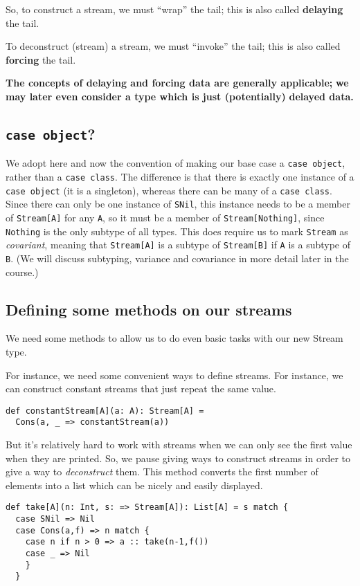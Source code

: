 \documentclass[11pt]{article}
\begin{document}
\begin{center}
So, to construct a stream, we must “wrap” the tail;
this is also called \textbf{delaying} the tail.

To deconstruct (stream) a stream, we must “invoke” the tail;
this is also called \textbf{forcing} the tail.

\textbf{The concepts of delaying and forcing data are generally applicable;}
\textbf{we may later even consider a type which is just (potentially)}
\textbf{delayed data.}
\end{center}

\subsection{\texttt{case object}?}
\label{sec:orga7b4ce3}
We adopt here and now the convention of making our base case
a \texttt{case object}, rather than a \texttt{case class}.
The difference is that there is exactly one instance of
a \texttt{case object} (it is a singleton),
whereas there can be many of a \texttt{case class}.
Since there can only be one instance of \texttt{SNil},
this instance needs to be a member of \texttt{Stream[A]} for any \texttt{A},
so it must be a member of \texttt{Stream[Nothing]}, since \texttt{Nothing} is
the only subtype of all types.
This does require us to mark \texttt{Stream} as \emph{covariant},
meaning that \texttt{Stream[A]} is a subtype of \texttt{Stream[B]} if
\texttt{A} is a subtype of \texttt{B}.
(We will discuss subtyping, variance and covariance
in more detail later in the course.)

\subsection{Defining some methods on our streams}
\label{sec:org7ca39c7}
We need some methods to allow us to do
even basic tasks with our new Stream type.

For instance, we need some convenient ways
to define streams.
For instance, we can construct constant streams
that just repeat the same value.
\begin{verbatim}
def constantStream[A](a: A): Stream[A] =
  Cons(a, _ => constantStream(a))
\end{verbatim}

But it's relatively hard to work with streams
when we can only see the first value
when they are printed.
So, we pause giving ways to construct streams
in order to give a way to \emph{deconstruct} them.
This method converts the first number of elements
into a list which can be nicely and easily displayed.
\begin{verbatim}
def take[A](n: Int, s: => Stream[A]): List[A] = s match {
  case SNil => Nil
  case Cons(a,f) => n match {
    case n if n > 0 => a :: take(n-1,f())
    case _ => Nil
    }
  }
\end{verbatim}
\end{document}
